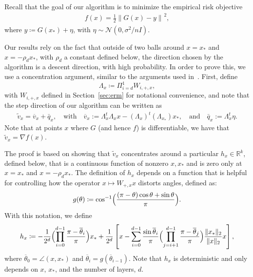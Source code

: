 \documentclass[11pt]{article}
\newcommand{\R}{\mathbb{R}}
\newcommand{\thetabar}{\overline{\theta}}
\newcommand{\red}[1]{{\color{red} #1}}
\newcommand{\blue}[1]{{\color{blue} #1}}
\newcommand{\xo}{x_\ast}
\newcommand{\PiWd}{\Pi_{i=d}^1 W_{i,+,x}}
\newcommand{\vbarx}{\overline{v}_{x}}
\newcommand{\hx}{h_x}
\newcommand\defeq{\coloneqq}
\newcommand{\Tnorm}{}
\newcommand\norm[2][\Tnorm]{\ensuremath{{\left\|#2\right\|}_{#1}}}
\newcommand\qbarx{\bar q_x}
\newcommand{\rhcomment}[1]{{\bf{{\blue{{RH --- #1}}}}}}
\newcommand\stepdir[1]{\tilde v_{#1}}
\begin{document}
Recall that the goal of our algorithm is to minimize the empirical risk objective
\begin{align*}
f(x) = \frac{1}{2} \norm{ G(x) - y }^2, %
\end{align*}
where $y \defeq G(\xo) + \eta$, with $\eta \sim \mathcal N(0,\sigma^2/n I)$.

Our results rely on the fact that outside of two balls around $x = \xo$ and $x = - \rho_d \xo$, with $\rho_d$ a constant defined below, the direction chosen by the algorithm is a descent direction, with high probability.
In order to prove this, we use a concentration argument, similar to the arguments used in~\citep{hand_global_2017}.
First, define 
\[
\Lambda_x \defeq \PiWd,
\]
with $W_{i,+,x}$ defined in Section~\ref{sec:erm} for notational convenience, and note that the step direction of our algorithm can be written as
\begin{align}
\stepdir{x} = \vbarx + \qbarx,
\quad
\text{with}
\quad
\vbarx :=
 \Lambda_x^t  \Lambda_x x -  (\Lambda_x)^t (\Lambda_{\xo}) \xo,
 \quad
 \text{and}
 \quad
 \qbarx := \Lambda_x^t \eta.
\label{defn-vxxo}
\end{align}
Note that at points $x$ where $G$ (and hence $f$) is differentiable, we have that $\stepdir{x} = \nabla f(x)$.

The proof is based on showing that $\stepdir{x}$ concentrates around a particular $\hx \in \R^k$, defined below, that is a continuous function of nonzero $x,\xo$ and is zero only at $x = \xo$ and $x = - \rho_d \xo$.
The definition of $\hx$ depends on a function that is helpful for controlling how the operator $x \mapsto W_{+,x} x$ distorts angles, defined as:\begin{align}
g(\theta) \defeq \cos^{-1} \Bigl( \frac{ (\pi - \theta) \cos \theta + \sin \theta}{\pi} \Bigr). \label{defn-g}
\end{align}
With this notation, we define
\begin{align*}
\hx \defeq - \frac{1}{2^d} \Bigl( \prod_{i=0}^{d-1} \frac{\pi - \thetabar_i}{\pi}  \Bigr)\xo
+ \frac{1}{2^d} \left[ x - \sum_{i=0}^{d-1} \frac{\sin \thetabar_i}{\pi}  \Bigl( \prod_{j=i+1}^{d-1} \frac{\pi - \thetabar_j}{\pi}  \Bigr)  \frac{\|\xo\|_2}{\|x\|_2} x  \right] ,
\end{align*}
where $\thetabar_0 = \angle(x, \xo)$ and $\thetabar_i = g(\thetabar_{i-1})$.
Note that $h_x$ is deterministic and only depends on $x$, $\xo$, and the number of layers, $d$.  %
\end{document}
